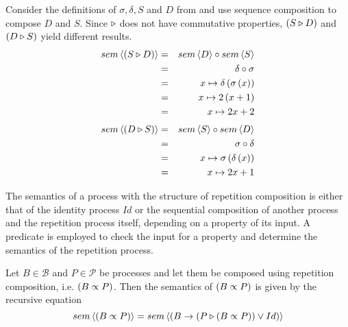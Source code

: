\begin{example}
\label{exp:sem_sequence}
Consider the definitions of $\sigma, \delta, S$ and $D$ from  and use sequence composition to compose $D$ and $S$. Since $\triangleright$ does not have commutative properties, $\left( S \triangleright D \right)$ and $\left( D \triangleright S \right)$ yield different results.
  \begin{eqnarray*}
    sem \left\langle \left( S \triangleright D \right) \right\rangle & = & sem \left\langle D \right\rangle \circ sem \left\langle S \right\rangle \\
                          & = & \delta \circ \sigma \\
                          & = & x \mapsto \delta \left( \sigma \left( x \right) \right) \\
                          & = & x \mapsto 2 \left( x+1 \right) \\
                          & = & x \mapsto 2x+2
  \end{eqnarray*}
  \begin{eqnarray*}
    sem \left\langle \left( D \triangleright S \right) \right\rangle & = & sem \left\langle S \right\rangle \circ sem \left\langle D \right\rangle \\
                          & = & \sigma \circ \delta \\
                          & = & x \mapsto \sigma \left( \delta \left( x \right) \right) \\
                          & = & x \mapsto 2x + 1
  \end{eqnarray*}
\end{example}


The semantics of a process with the structure of repetition composition is either that of the identity process $Id$ or the sequential composition of another process and the repetition process itself, depending on a property of its input. A predicate is employed to check the input for a property and determine the semantics of the repetition process.
\begin{definition}
\label{def:sem_repetition}
Let $B \in \mathcal{B}$ and $P \in \mathcal{P}$ be processes and let them be composed using repetition composition, i.e. $\left( B \propto P \right)$. Then the semantics of $\left( B \propto P \right)$ is given by the recursive equation
  \begin{equation*}
    \label{eqn_sem_repetition}
    sem \left\langle \left( B \propto P \right) \right\rangle = sem \left\langle \left( B \to \left( P \triangleright \left( B \propto P \right) \right) \vee Id \right) \right\rangle
  \end{equation*}
  \hfill\qedsymbol
\end{definition}

